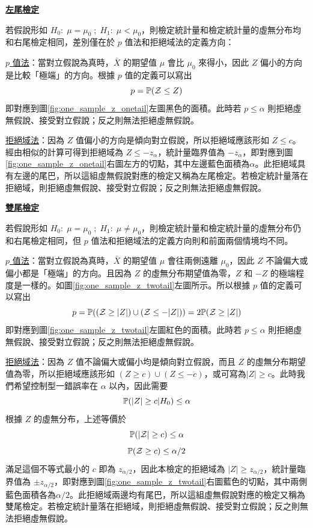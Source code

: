     \noindent\underline{\textbf{左尾檢定}}

    若假說形如 $H_0: \; \mu = \mu_0 \; ; \; H_1: \; \mu < \mu_0$，則檢定統計量和檢定統計量的虛無分布均和右尾檢定相同，差別僅在於 $p$ 值法和拒絕域法的定義方向：

    \noindent \underline{$p$ 值法}：當對立假說為真時，$\bar{X}$ 的期望值 $\mu$ 會比 $\mu_0$ 來得小，因此 $Z$ 偏小的方向是比較「極端」的方向。根據 $p$ 值的定義可以寫出
    \smallskip
    \[p = \mathbb{P}(\mathcal{Z} \le Z)\]
    \smallskip
    即對應到圖\ref{fig:one_sample_z_onetail}左圖黑色的面積。此時若 $p \le \alpha$ 則拒絕虛無假說、接受對立假說；反之則無法拒絕虛無假說。
    
    \noindent \underline{拒絕域法}：因為 $Z$ 值偏小的方向是傾向對立假說，所以拒絕域應該形如 $Z \le c$。經由相似的計算可得到拒絕域為 $Z \le -z_\alpha$，統計量臨界值為 $-z_\alpha$，即對應到圖\ref{fig:one_sample_z_onetail}右圖左方的切點，其中左邊藍色面積為$\alpha$。此拒絕域具有左邊的尾巴，所以這組虛無假說對應的檢定又稱為左尾檢定。若檢定統計量落在拒絕域，則拒絕虛無假說、接受對立假說；反之則無法拒絕虛無假說。

    \bigskip

    \noindent\underline{\textbf{雙尾檢定}}

    若假說形如 $H_0: \; \mu = \mu_0 \; ; \; H_1: \; \mu \ne \mu_0$，則檢定統計量和檢定統計量的虛無分布仍和右尾檢定相同，但 $p$ 值法和拒絕域法的定義方向則和前面兩個情境均不同。

    \noindent \underline{$p$ 值法}：當對立假說為真時，$\bar{X}$ 的期望值 $\mu$ 會往兩側遠離 $\mu_0$，因此 $Z$ 不論偏大或偏小都是「極端」的方向。且因為 $Z$ 的虛無分布期望值為零，$Z$ 和 $-Z$ 的極端程度是一樣的。如圖\ref{fig:one_sample_z_twotail}左圖所示。所以根據 $p$ 值的定義可以寫出
    \[p = \mathbb{P}((\mathcal{Z} \ge |Z|)\cup(\mathcal{Z} \le -|Z|)) = 2\mathbb{P}(\mathcal{Z} \ge |Z|)\]
    即對應到圖\ref{fig:one_sample_z_twotail}左圖紅色的面積。此時若 $p \le \alpha$ 則拒絕虛無假說、接受對立假說；反之則無法拒絕虛無假說。
    
    \noindent \underline{拒絕域法}：因為 $Z$ 值不論偏大或偏小均是傾向對立假說，而且 $Z$ 的虛無分布期望值為零，所以拒絕域應該形如 $(Z \ge c)\cup(Z \le -c)$，或可寫為$|Z| \ge c$。此時我們希望控制型一錯誤率在 $\alpha$ 以內，因此需要
    \smallskip
    \[\mathbb{P}(|Z| \ge c|H_0) \le \alpha\]
    \smallskip
    根據 $Z$ 的虛無分布，上述等價於
    \smallskip
    \[\mathbb{P}(|\mathcal{Z}| \ge c) \le \alpha\]
    \[\mathbb{P}(\mathcal{Z} \ge c) \le \alpha/2\]
    \smallskip
    滿足這個不等式最小的 $c$ 即為 $z_{\alpha/2}$，因此本檢定的拒絕域為 $|Z| \ge z_{\alpha/2}$，統計量臨界值為 $\pm z_{\alpha/2}$，即對應到圖\ref{fig:one_sample_z_twotail}右圖藍色的切點，其中兩側藍色面積各為$\alpha/2$。此拒絕域兩邊均有尾巴，所以這組虛無假說對應的檢定又稱為雙尾檢定。若檢定統計量落在拒絕域，則拒絕虛無假說、接受對立假說；反之則無法拒絕虛無假說。

